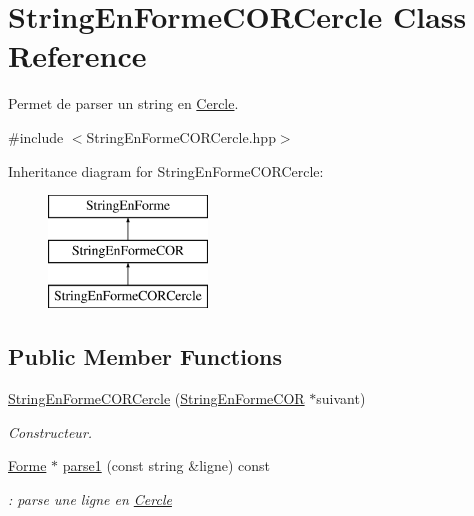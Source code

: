 \hypertarget{class_string_en_forme_c_o_r_cercle}{}\section{String\+En\+Forme\+C\+O\+R\+Cercle Class Reference}
\label{class_string_en_forme_c_o_r_cercle}


Permet de parser un string en \mbox{\hyperlink{class_cercle}{Cercle}}.  




{\ttfamily \#include $<$String\+En\+Forme\+C\+O\+R\+Cercle.\+hpp$>$}

Inheritance diagram for String\+En\+Forme\+C\+O\+R\+Cercle\+:\begin{figure}[H]
\begin{center}
\leavevmode
\includegraphics[height=3.000000cm]{class_string_en_forme_c_o_r_cercle}
\end{center}
\end{figure}
\subsection*{Public Member Functions}
\begin{DoxyCompactItemize}
\item 
\mbox{\hyperlink{class_string_en_forme_c_o_r_cercle_ab5995f81a07ffa0650c3545e6a0d6d75}{String\+En\+Forme\+C\+O\+R\+Cercle}} (\mbox{\hyperlink{class_string_en_forme_c_o_r}{String\+En\+Forme\+C\+OR}} $\ast$suivant)
\begin{DoxyCompactList}\small\item\em Constructeur. \end{DoxyCompactList}\item 
\mbox{\hyperlink{class_forme}{Forme}} $\ast$ \mbox{\hyperlink{class_string_en_forme_c_o_r_cercle_aedfc3cf191db95e0e52f8a48d1e89016}{parse1}} (const string \&ligne) const
\begin{DoxyCompactList}\small\item\em \+: parse une ligne en \mbox{\hyperlink{class_cercle}{Cercle}} \end{DoxyCompactList}\end{DoxyCompactItemize}


